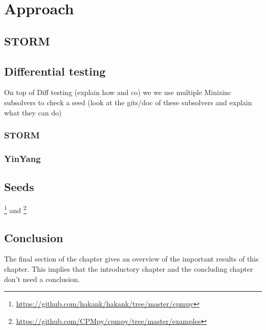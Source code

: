 \chapter{Approach}
\label{cha:v}

\section{STORM}
\section{Differential testing}
On top of Diff testing (explain how and co) we we use multiple Minizinc subsolvers to check a seed (look at the gits/doc of these subsolvers and explain what they can do)
\subsection{STORM}
\subsection{YinYang}

\section{Seeds}
\footnote{\url{https://github.com/hakank/hakank/tree/master/cpmpy}} and \cite{18bleukx2022model}
\footnote{\url{https://github.com/CPMpy/cpmpy/tree/master/examples}}

\section{Conclusion}
The final section of the chapter gives an overview of the important results
of this chapter. This implies that the introductory chapter and the
concluding chapter don't need a conclusion.

